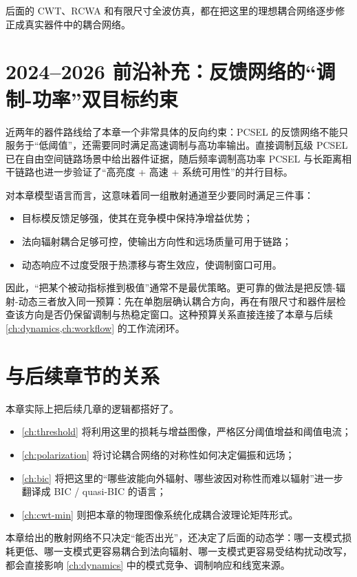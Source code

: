 后面的 CWT、RCWA 和有限尺寸全波仿真，都在把这里的理想耦合网络逐步修正成真实器件中的耦合网络。

\section{2024--2026 前沿补充：反馈网络的“调制-功率”双目标约束}
近两年的器件路线给了本章一个非常具体的反向约束：PCSEL 的反馈网络不能只服务于“低阈值”，还需要同时满足高速调制与高功率输出。直接调制瓦级 PCSEL 已在自由空间链路场景中给出器件证据\cite{inoue2024wattclassdm}，随后频率调制高功率 PCSEL 与长距离相干链路也进一步验证了“高亮度 + 高速 + 系统可用性”的并行目标\cite{inoue2025fmpcsel,jlt2026cbanddmpcsel}。

对本章模型语言而言，这意味着同一组散射通道至少要同时满足三件事：
\begin{itemize}
  \item 目标模反馈足够强，使其在竞争模中保持净增益优势；
  \item 法向辐射耦合足够可控，使输出方向性和远场质量可用于链路；
  \item 动态响应不过度受限于热漂移与寄生效应，使调制窗口可用。
\end{itemize}
因此，“把某个被动指标推到极值”通常不是最优策略。更可靠的做法是把反馈-辐射-动态三者放入同一预算：先在单胞层确认耦合方向，再在有限尺寸和器件层检查该方向是否仍保留调制与热稳定窗口。这种预算关系直接连接了本章与后续 \cref{ch:dynamics,ch:workflow} 的工作流闭环。

\section{与后续章节的关系}
本章实际上把后续几章的逻辑都搭好了。
\begin{itemize}
  \item \cref{ch:threshold} 将利用这里的损耗与增益图像，严格区分阈值增益和阈值电流；
  \item \cref{ch:polarization} 将讨论耦合网络的对称性如何决定偏振和远场；
  \item \cref{ch:bic} 将把这里的“哪些波能向外辐射、哪些波因对称性而难以辐射”进一步翻译成 BIC / quasi-BIC 的语言；
  \item \cref{ch:cwt-min} 则把本章的物理图像系统化成耦合波理论矩阵形式。
\end{itemize}

本章给出的散射网络不只决定“能否出光”，还决定了后面的动态学：哪一支模式损耗更低、哪一支模式更容易耦合到法向辐射、哪一支模式更容易受结构扰动改写，都会直接影响 \cref{ch:dynamics} 中的模式竞争、调制响应和线宽来源。

